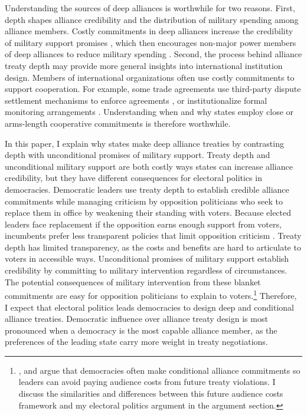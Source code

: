 \documentclass[12pt]{article}
\begin{document}
Understanding the sources of deep alliances is worthwhile for two reasons.
First, depth shapes alliance credibility and the distribution of military spending among alliance members. 
Costly commitments in deep alliances increase the credibility of military support promises \citep{Morrow1994}, which then encourages non-major power members of deep alliances to reduce military spending \citep{Alley2020}.  
Second, the process behind alliance treaty depth may provide more general insights into international institution design. 
Members of international organizations often use costly commitments to support cooperation. 
For example, some trade agreements use third-party dispute settlement mechanisms to enforce agreements \citep{Smith2000}, or institutionalize formal monitoring arrangements \citep{Duretal2013}.  
Understanding when and why states employ close or arms-length cooperative commitments is therefore worthwhile. 


In this paper, I explain why states make deep alliance treaties by contrasting depth with unconditional promises of military support. 
Treaty depth and unconditional military support are both costly ways states can increase alliance credibility, but they have different consequences for electoral politics in democracies. 
Democratic leaders use treaty depth to establish credible alliance commitments while managing criticism by opposition politicians who seek to replace them in office by weakening their standing with voters.
Because elected leaders face replacement if the opposition earns enough support from voters, incumbents prefer less transparent policies that limit opposition criticism \citep{Kono2006}.
Treaty depth has limited transparency, as the costs and benefits are hard to articulate to voters in accessible ways. 
Unconditional promises of military support establish credibility by committing to military intervention regardless of circumstances.  
The potential consequences of military intervention from these blanket commitments are easy for opposition politicians to explain to voters.\footnote{\citet{Mattes2012}, \citet{Chibaetal2015} and \citet{FjelstulReiter2019} argue that democracies often make conditional alliance commitments so leaders can avoid paying audience costs from future treaty violations. I discuss the similarities and differences between this future audience costs framework and my electoral politics argument in the argument section.} 
Therefore, I expect that electoral politics leads democracies to design deep and conditional alliance treaties. 
Democratic influence over alliance treaty design is most pronounced when a democracy is the most capable alliance member, as the preferences of the leading state carry more weight in treaty negotiations. 
\end{document}
